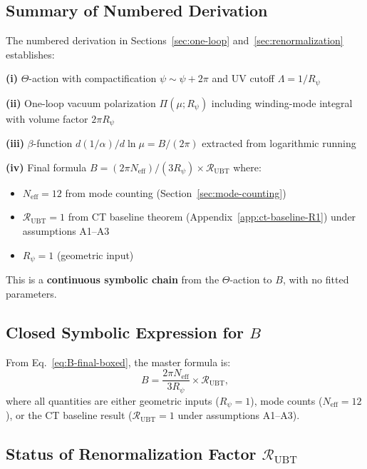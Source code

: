 \documentclass[11pt,a4paper]{article}
\theoremstyle{remark}
\begin{document}
\subsection{Summary of Numbered Derivation}

The numbered derivation in Sections~\ref{sec:one-loop} and~\ref{sec:renormalization} establishes:

\textbf{(i)} $\Theta$-action with compactification $\psi \sim \psi + 2\pi$ and UV cutoff $\Lambda = 1/R_\psi$

\textbf{(ii)} One-loop vacuum polarization $\Pi(\mu; R_\psi)$ including winding-mode integral with volume factor $2\pi R_\psi$

\textbf{(iii)} $\beta$-function $d(1/\alpha)/d \ln \mu = B/(2\pi)$ extracted from logarithmic running

\textbf{(iv)} Final formula $B = (2\pi N_{\text{eff}})/(3 R_\psi) \times \mathcal{R}_{\text{UBT}}$ where:
\begin{itemize}
\item $N_{\text{eff}} = 12$ from mode counting (Section~\ref{sec:mode-counting})
\item $\mathcal{R}_{\text{UBT}} = 1$ from CT baseline theorem (Appendix~\ref{app:ct-baseline-R1}) under assumptions A1--A3
\item $R_\psi = 1$ (geometric input)
\end{itemize}

This is a \textbf{continuous symbolic chain} from the $\Theta$-action to $B$, with no fitted parameters.

\subsection{Closed Symbolic Expression for $B$}

From Eq.~\eqref{eq:B-final-boxed}, the master formula is:
\begin{equation}
B = \frac{2\pi N_{\text{eff}}}{3 R_\psi} \times \mathcal{R}_{\text{UBT}},
\label{eq:B-symbolic-master}
\end{equation}
where all quantities are either geometric inputs ($R_\psi = 1$), mode counts ($N_{\text{eff}} = 12$), or the CT baseline result ($\mathcal{R}_{\text{UBT}} = 1$ under assumptions A1--A3).

\subsection{Status of Renormalization Factor $\mathcal{R}_{\text{UBT}}$}
\end{document}
